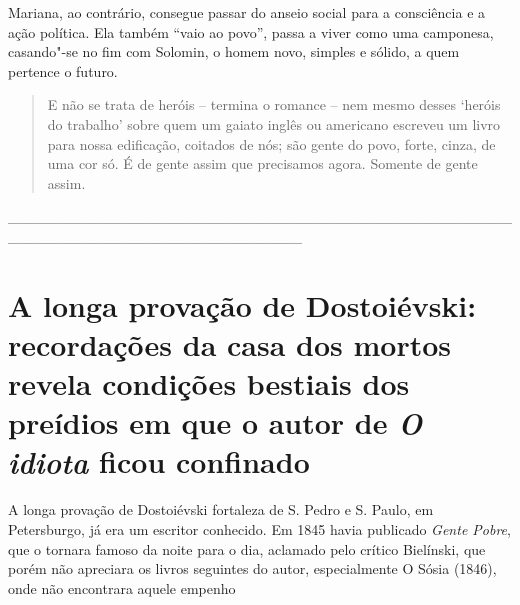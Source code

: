 Mariana, ao contrário, consegue passar do anseio social para a
consciência e a ação política. Ela também ``vaio ao povo'', passa a
viver como uma camponesa, casando"-se no fim com Solomin, o homem novo,
simples e sólido, a quem pertence o futuro.

\begin{quote}
E não se trata de heróis -- termina o romance -- nem mesmo desses
`heróis do trabalho' sobre quem um gaiato inglês ou americano escreveu
um livro para nossa edificação, coitados de nós; são gente do povo,
forte, cinza, de uma cor só. É de gente assim que precisamos agora.
Somente de gente assim.
\end{quote}

\_\_\_\_\_\_\_\_\_\_\_\_\_\_\_\_\_\_\_\_\_\_\_\_\_\_\_\_\_\_\_\_\_\_\_\_\_\_\_\_\_\_\_\_\_\_\_\_\_\_\_\_\_\_\_\_\_\_\_\_\_\_\_\_\_\_\_\_\_\_\_\_\_\_\_\_

\chapter{A longa provação de Dostoiévski: recordações da casa dos mortos revela condições bestiais dos preídios em que o autor de \emph{O
idiota} ficou confinado}

A longa provação de Dostoiévski fortaleza de S. Pedro e S. Paulo, em
Petersburgo, já era um escritor conhecido. Em 1845 havia publicado
\emph{Gente Pobre}, que o tornara famoso da noite para o dia, aclamado
pelo crítico Bielínski, que porém não apreciara os livros seguintes do
autor, especialmente O Sósia (1846), onde não encontrara aquele empenho

